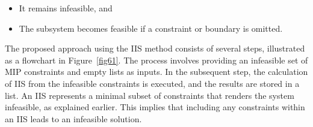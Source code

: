    \begin{itemize}
        \item  It remains infeasible, and
        
        \item The subsystem becomes feasible if a constraint or boundary is omitted.
    \end{itemize}
    
    

    
    
    The proposed approach using the IIS method consists of several steps, illustrated as a flowchart in Figure~\ref{fig61}. The process involves providing an infeasible set of MIP constraints and empty lists as inputs. In the subsequent step, the calculation of IIS from the infeasible constraints is executed, and the results are stored in a list. An IIS represents a minimal subset of constraints that renders the system infeasible, as explained earlier. This implies that including any constraints within an IIS leads to an infeasible solution.
    
